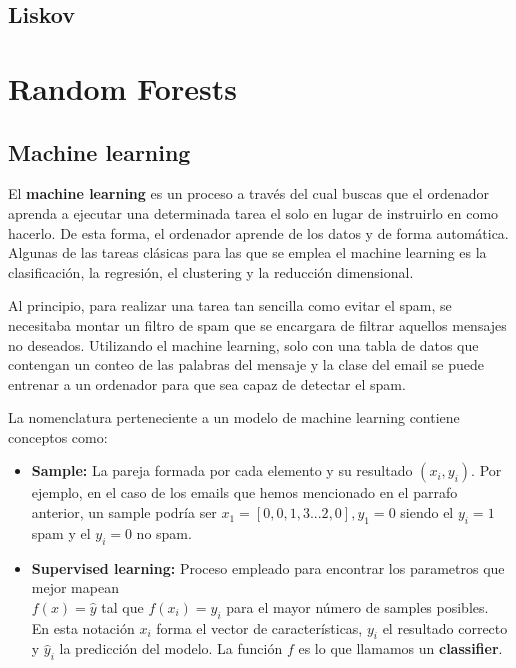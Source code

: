 \documentclass[11pt]{article}
\theoremstyle{plain}
\begin{document}
       \subsection{Liskov} %
        \label{sub:liskov}
        
    \section{Random Forests} %
    \label{sec:random_forests}
        \subsection{Machine learning} %
        \label{sub:machine_learning}
            El \textbf{machine learning} es un proceso a través del cual buscas que el ordenador aprenda a ejecutar una determinada tarea el solo en lugar de instruirlo en como hacerlo. De esta forma, el ordenador aprende de los datos y de forma automática. Algunas de las tareas clásicas para las que se emplea el machine learning es la clasificación, la regresión, el clustering y la reducción dimensional.

            Al principio, para realizar una tarea tan sencilla como evitar el spam, se necesitaba montar un filtro de spam que se encargara de filtrar aquellos mensajes no deseados. Utilizando el machine learning, solo con una tabla de datos que contengan un conteo de las palabras del mensaje y la clase del email se puede entrenar a un ordenador para que sea capaz de detectar el spam.

            La nomenclatura perteneciente a un modelo de machine learning contiene conceptos como:
            \begin{itemize}
                \item \textbf{Sample:} La pareja formada por cada elemento y su resultado $(x_i,y_i)$. Por ejemplo, en el caso de los emails que hemos mencionado en el parrafo anterior, un sample podría ser $x_1 = [0,0,1,3...2,0], y_1 = 0$ siendo el $y_i = 1$ spam y el $y_i = 0$ no spam.
                \item \textbf{Supervised learning:} Proceso empleado para encontrar los parametros que mejor mapean\\ $f(x) = \hat y$ tal que $f(x_i) = y_i$ para el mayor número de samples posibles.\\

                En esta notación $x_i$ forma el vector de características, $y_i$ el resultado correcto y $\hat y_i$ la predicción del modelo. La función $f$ es lo que llamamos un \textbf{classifier}.
            \end{itemize}
\end{document}

